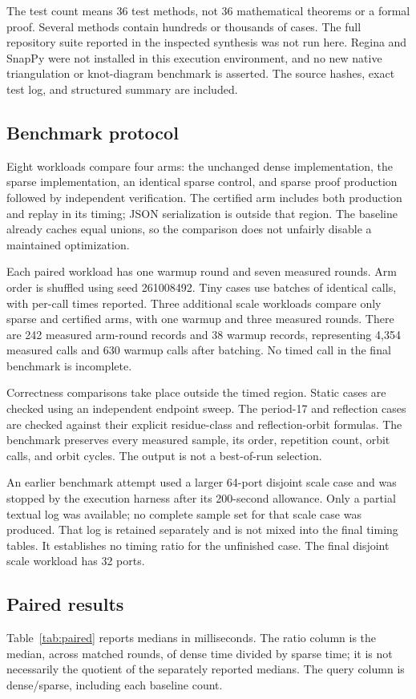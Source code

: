 \documentclass[11pt,letterpaper]{article}
\theoremstyle{definition}
\begin{document}
The test count means 36 test methods, not 36 mathematical theorems or a
formal proof. Several methods contain hundreds or thousands of cases.
The full repository suite reported in the inspected synthesis was not run
here. Regina and SnapPy were not installed in this execution environment,
and no new native triangulation or knot-diagram benchmark is asserted.
The source hashes, exact test log, and structured summary are included.

\subsection{Benchmark protocol}
Eight workloads compare four arms: the unchanged dense implementation,
the sparse implementation, an identical sparse control, and sparse proof
production followed by independent verification. The certified arm includes
both production and replay in its timing; JSON serialization is outside
that region. The baseline already caches equal unions, so the comparison
does not unfairly disable a maintained optimization.

Each paired workload has one warmup round and seven measured rounds.
Arm order is shuffled using seed 261008492. Tiny cases use batches of
identical calls, with per-call times reported. Three additional scale
workloads compare only sparse and certified arms, with one warmup and
three measured rounds. There are 242 measured arm-round records and 38
warmup records, representing 4,354 measured calls and 630 warmup calls
after batching. No timed call in the final benchmark is incomplete.

Correctness comparisons take place outside the timed region. Static cases
are checked using an independent endpoint sweep. The period-17 and
reflection cases are checked against their explicit residue-class and
reflection-orbit formulas. The benchmark preserves every measured sample,
its order, repetition count, orbit calls, and orbit cycles. The output is
not a best-of-run selection.

An earlier benchmark attempt used a larger 64-port disjoint scale case and
was stopped by the execution harness after its 200-second allowance. Only
a partial textual log was available; no complete sample set for that scale
case was produced. That log is retained separately and is not mixed into
the final timing tables. It establishes no timing ratio for the unfinished
case. The final disjoint scale workload has 32 ports.

\subsection{Paired results}
Table~\ref{tab:paired} reports medians in milliseconds. The ratio column
is the median, across matched rounds, of dense time divided by sparse time;
it is not necessarily the quotient of the separately reported medians.
The query column is dense/sparse, including each baseline count.
\end{document}
